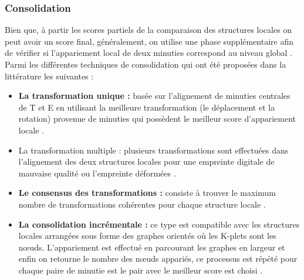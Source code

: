 	 	\subsubsection{Consolidation}
	 	Bien que, à partir les scores partiels de la comparaison des structures locales on peut avoir un score final, généralement, on utilise une phase supplémentaire afin de vérifier si l’appariement local de deux minuties correspond au niveau global \citep{maltoni2009handbook}. Parmi les différentes techniques de consolidation qui ont été proposées dans la littérature les suivantes :
	 	\begin{itemize}
	 		\item \textbf{La transformation unique :} basée sur l'alignement de minuties centrales de T et E en utilisant la meilleure transformation (le déplacement et la rotation) provenue de minuties qui possèdent le meilleur score d'appariement locale \citep{jiang2000fingerprint}.
	 		\item 	La transformation multiple : plusieurs transformations sont effectuées dans l’alignement des deux structures locales pour une empreinte digitale de mauvaise qualité ou l'empreinte déformées \citep{maltoni2009handbook}.
	 		\item \textbf{Le consensus des transformations : }consiste à trouver le  maximum  nombre de transformations cohérentes pour chaque structure locale \citep{maltoni2009handbook}.
	 		\item \textbf{La consolidation incrémentale :} ce type est compatible avec les structures locales arrangées sous forme des graphes orientés où les K-plets sont les nœuds. L'appariement est effectué en parcourant les graphes en largeur et enfin on retourne le nombre des nœuds appariés, ce processus est répété pour chaque paire de minutie est le pair avec le meilleur score est choisi \citep{chikkerur2006k}.
	 	\end{itemize}
